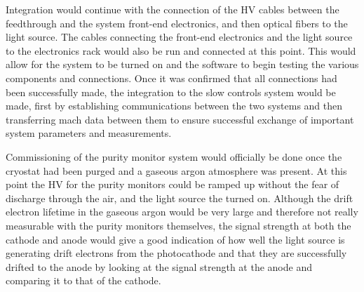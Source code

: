 Integration would continue with the connection of the HV cables between the feedthrough and the system front-end electronics, and then optical fibers to the light source.  The cables connecting the front-end electronics and the light source to the electronics rack would also be run and connected at this point.  This would allow for the system to be turned on and the software to begin testing the various components and connections.  Once it was confirmed that all connections had been successfully made, the integration to the slow controls system would be made, first by establishing communications between the two systems and then transferring mach data between them to ensure successful exchange of important system parameters and measurements.  

Commissioning of the purity monitor system would officially be done once the cryostat had been purged and a gaseous argon atmosphere was present.  At this point the HV for the purity monitors could be ramped up without the fear of discharge through the air, and the light source the turned on.  Although the drift electron lifetime in the gaseous argon would be very large and therefore not really measurable with the purity monitors themselves, the signal strength at both the cathode and anode would give a good indication of how well the light source is generating drift electrons from the photocathode and that they are successfully drifted to the anode by looking at the signal strength at the anode and comparing it to that of the cathode.



